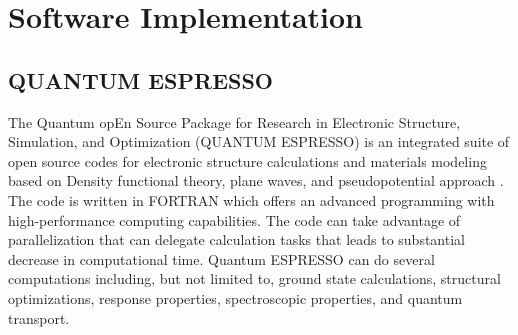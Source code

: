 \chapter{Software Implementation} \label{chap:software}
\section{QUANTUM ESPRESSO}
The Quantum opEn  Source  Package  for  Research  in  Electronic  Structure, Simulation, and Optimization (QUANTUM ESPRESSO) is an integrated suite of open source codes for electronic structure calculations and materials modeling based on Density functional theory, plane waves, and pseudopotential approach \citep{Giannozzi2009,Giannozzi2017}. The code is written in FORTRAN which offers an advanced programming with high-performance computing capabilities. The code can take advantage of parallelization that can delegate calculation tasks that leads to substantial decrease in computational time. Quantum ESPRESSO can do several computations including, but not limited to, ground state calculations, structural optimizations, response properties, spectroscopic properties, and quantum transport.

